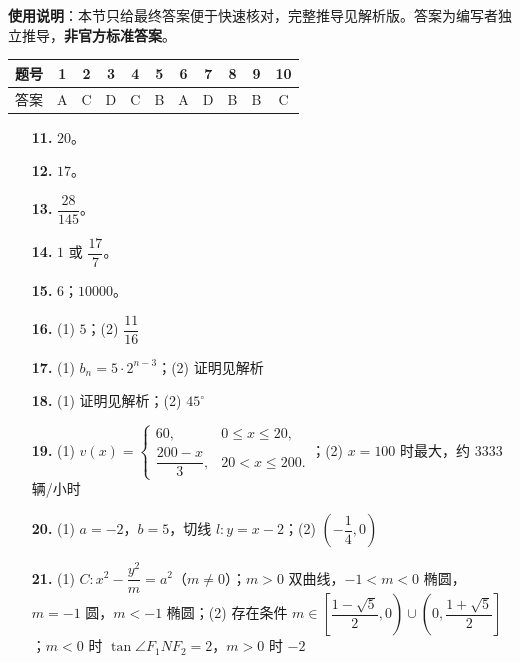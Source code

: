 
\begin{gknotice}
\textbf{使用说明}：本节只给最终答案便于快速核对，完整推导见解析版。答案为编写者独立推导，\textbf{非官方标准答案}。
\end{gknotice}

\begin{center}\begin{tabular}{ccccccccccc}
\toprule
题号 & 1 & 2 & 3 & 4 & 5 & 6 & 7 & 8 & 9 & 10 \\
\midrule
答案 & A & C & D & C & B & A & D & B & B & C \\
\bottomrule
\end{tabular}\end{center}

\begin{itemize}[leftmargin=2.6em]
  \item[\textbf{11.}] $20$。
  \item[\textbf{12.}] $17$。
  \item[\textbf{13.}] $\dfrac{28}{145}$。
  \item[\textbf{14.}] $1$ 或 $\dfrac{17}{7}$。
  \item[\textbf{15.}] $6$；$10000$。
\end{itemize}

\begin{itemize}[leftmargin=2.6em]
  \item[\textbf{16.}] (1) $5$；(2) $\dfrac{11}{16}$
  \item[\textbf{17.}] (1) $b_n=5\cdot2^{n-3}$；(2) 证明见解析
  \item[\textbf{18.}] (1) 证明见解析；(2) $45^\circ$
  \item[\textbf{19.}] (1) $v(x)=\begin{cases}60,&0\leqslant x\leqslant20,\\[4pt]\dfrac{200-x}3,&20<x\leqslant200.\end{cases}$；(2) $x=100$ 时最大，约 $3333$ 辆/小时
  \item[\textbf{20.}] (1) $a=-2$，$b=5$，切线 $l:y=x-2$；(2) $\left(-\dfrac14,0\right)$
  \item[\textbf{21.}] (1) $C:x^2-\dfrac{y^2}{m}=a^2$（$m\neq0$）；$m>0$ 双曲线，$-1<m<0$ 椭圆，$m=-1$ 圆，$m<-1$ 椭圆；(2) 存在条件 $m\in\left[\dfrac{1-\sqrt5}2,0\right)\cup\left(0,\dfrac{1+\sqrt5}2\right]$；$m<0$ 时 $\tan\angle F_1NF_2=2$，$m>0$ 时 $-2$
\end{itemize}
